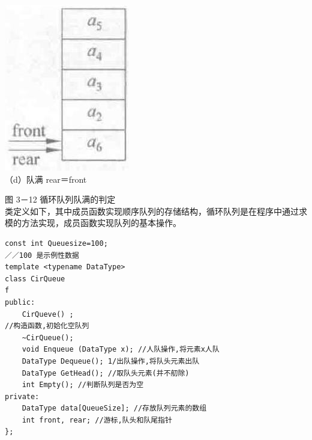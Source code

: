 \documentclass[10pt]{article}
\begin{document}
\includegraphics[max width=\textwidth, center]{2025_06_06_704745ea57b15b2333e5g-094}\\
（d）队满 rear＝front

图 3－12 循环队列队满的判定\\
类定义如下，其中成员函数实现顺序队列的存储结构，循环队列是在程序中通过求模的方法实现，成员函数实现队列的基本操作。

\begin{verbatim}
const int Queuesize=100;
／／100 是示例性数据
template <typename DataType>
class CirQueue
f
public:
    CirQueve() ;
//构造函数,初姶化空队列
    ~CirQueue();
    void Enqueue (DataType x); //人队操作,将元素x人队
    DataType Dequeue(); 1/出队操作,将队头元素出队
    DataType GetHead(); //取队头元素(并不舠除)
    int Empty(); //判断队列是否为空
private:
    DataType data[QueueSize]; //存放队列元素的数组
    int front, rear; //游标,队头和队尾指针
};
\end{verbatim}
\end{document}
